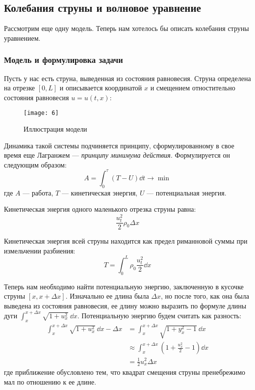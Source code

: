 \subsection{Колебания струны и волновое уравнение}

Рассмотрим еще одну модель. Теперь нам хотелось бы описать колебания струны уравнением.

\subsubsection{Модель и формулировка задачи}

Пусть у нас есть струна, выведенная из состояния равновесия. Струна определена на отрезке $[0, L]$ и описывается координатой $x$ и смещением отностительно состояния равновесия $u = u(t, x)$:
%
\begin{figure}[ht]
  \centering
  \texttt{[image: 6]}
  \caption{Иллюстрация модели}
\end{figure}

Динамика такой системы подчиняется принципу, сформулированному в свое время еще Лагранжем --- \emph{принципу минимума действия}. Формулируется он следующим образом:
%
\begin{equation}
  A = \int_0^\tau (T - U) \dd t \longrightarrow \min
  \label{lecture1-lagrange}
\end{equation}
%
где $A$ --- работа, $T$ --- кинетическая энергия, $U$ --- потенциальная энергия.

Кинетическая энергия одного маленького отрезка струны равна:
%
\begin{equation*}
  \frac{u_t^2}{2} \rho_0 \Delta x
\end{equation*}

Кинетическая энергия всей струны находится как предел риманновой суммы при измельчении разбиения:
%
\begin{equation}
  T = \int_0^L \rho_0 \frac{u_t^2}{2} \dd x
  \label{lecture1-kinetic}
\end{equation}

Теперь нам необходимо найти потенциальную энергию, заключенную в кусочке струны $[x, x+\Delta x]$. Изначально ее длина была $\Delta x$, но после того, как она была выведена из состояния равновесия, ее длину можно выразить по формуле длины дуги $\int_x^{x + \Delta x} \sqrt{1 + u_x^2}\ \dd x$. Потенциальную энергию будем считать как разность:
%
\begin{equation}
  \begin{aligned}
    \int_x^{x + \Delta x} \sqrt{1 + u_x^2}\ \dd x - \Delta x &= \int_x^{x + \Delta x} \sqrt{1 + y_x^2 - 1}\ \dd x \\
    &\approx \int_x^{x + \Delta x} \left(1 + \frac{u_x^2}{2} - 1\right) \dd x \\
    &= \frac{1}{2} u_x^2 \Delta x
  \end{aligned}
  \label{lecture1-potential}
\end{equation}
%
где приближение обусловлено тем, что квадрат смещения струны пренебрежимо мал по отношению к ее длине.

